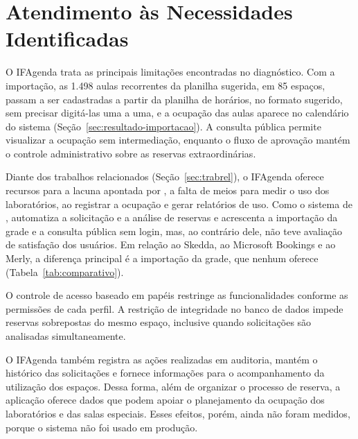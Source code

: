 \section{Atendimento às Necessidades Identificadas}
\label{sec:resultado-necessidades}

O IFAgenda trata as principais limitações encontradas no diagnóstico. Com a importação, as 1.498 aulas recorrentes da planilha sugerida, em 85 espaços, passam a ser cadastradas a partir da planilha de horários, no formato sugerido, sem precisar digitá-las uma a uma, e a ocupação das aulas aparece no calendário do sistema (Seção~\ref{sec:resultado-importacao}). A consulta pública permite visualizar a ocupação sem intermediação, enquanto o fluxo de aprovação mantém o controle administrativo sobre as reservas extraordinárias.

Diante dos trabalhos relacionados (Seção~\ref{sec:trabrel}), o IFAgenda oferece recursos para a lacuna apontada por , a falta de meios para medir o uso dos laboratórios, ao registrar a ocupação e gerar relatórios de uso. Como o sistema de , automatiza a solicitação e a análise de reservas e acrescenta a importação da grade e a consulta pública sem login, mas, ao contrário dele, não teve avaliação de satisfação dos usuários. Em relação ao Skedda, ao Microsoft Bookings e ao Merly, a diferença principal é a importação da grade, que nenhum oferece (Tabela~\ref{tab:comparativo}).

O controle de acesso baseado em papéis restringe as funcionalidades conforme as permissões de cada perfil. A restrição de integridade no banco de dados impede reservas sobrepostas do mesmo espaço, inclusive quando solicitações são analisadas simultaneamente.

O IFAgenda também registra as ações realizadas em auditoria, mantém o histórico das solicitações e fornece informações para o acompanhamento da utilização dos espaços. Dessa forma, além de organizar o processo de reserva, a aplicação oferece dados que podem apoiar o planejamento da ocupação dos laboratórios e das salas especiais. Esses efeitos, porém, ainda não foram medidos, porque o sistema não foi usado em produção.
